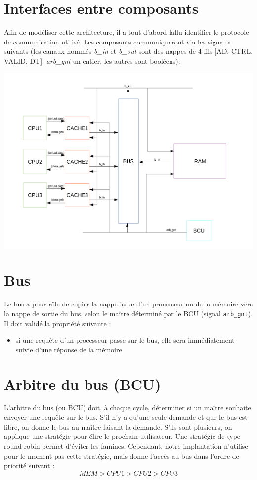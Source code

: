 \documentclass[a4paper, 11pt]{article}
\begin{document}
\section{Interfaces entre composants}
Afin de modéliser cette architecture, il a tout d'abord fallu identifier le 
protocole de communication utilisé. Les composants communiqueront via les
signaux suivants (les canaux nommés \textit{b\_in} et \textit{b\_out} sont
des nappes de 4 fils [AD, CTRL, VALID, DT], \textit{arb\_gnt} un entier,
les autres sont booléens):
\begin{center}
\centerline{\includegraphics[scale=0.5]{images/archi.pdf}}
\end{center}

\section{Bus}
Le bus a pour rôle de copier la nappe issue d'un processeur ou de la mémoire
vers la nappe de sortie du bus, selon le maître déterminé par le BCU (signal
\texttt{arb\_gnt}). Il doit validé la propriété suivante :
\begin{itemize}
  \item si une requête d'un processeur passe sur le bus, elle sera immédiatement
    suivie d'une réponse de la mémoire
\end{itemize}

\section{Arbitre du bus (BCU)}
L'arbitre du bus (ou BCU) doit, à chaque cycle, déterminer si un maître souhaite
envoyer une requête sur le bus. S'il n'y a qu'une seule demande et que le bus est
libre, on donne le bus au maître faisant la demande. S'ils sont plusieurs, on
applique une stratégie pour élire le prochain utilisateur. Une stratégie de type
round-robin permet d'éviter les famines. Cependant, notre implantation n'utilise
pour le moment pas cette stratégie, mais donne l'accès au bus dans l'ordre de 
priorité suivant :
\[
MEM > CPU1 > CPU2 > CPU3
\]
\end{document}
